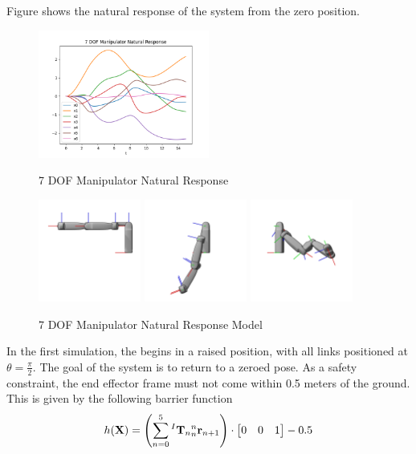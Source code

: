 \noindent Figure \label{fig:HighDOFNat} shows the natural response of the system from the zero position.

\begin{figure}[H]
    \centering
    \includegraphics[width=0.5\textwidth]{Figures/Examples/7DOF/NaturalResponse.png}
    \caption{7 DOF Manipulator Natural Response}
    \label{fig:HighDOFNat}
    \includegraphics[width=0.3\textwidth]{Figures/Examples/7DOF/Frame0WithFrames.png}
    \includegraphics[width=0.3\textwidth]{Figures/Examples/7DOF/Frame50WithFrames.png}
    \includegraphics[width=0.3\textwidth]{Figures/Examples/7DOF/Frame100WithFrames.png}
    \caption{7 DOF Manipulator Natural Response Model}
\end{figure}

In the first simulation, the begins in a raised position, with all links positioned at $\theta = \frac{\pi}{2}$. The goal of the system is to return to a zeroed pose. As a safety constraint, the end effector frame must not come within 0.5 meters of the ground. This is given by the following barrier function
\begin{align}
    h(\mathbf{X}) = \left (\sum_{n=0}^5 {^I\mathbf{T}_n}{^n_n\mathbf{r}_{n+1}} \right) \cdot \begin{bmatrix} 0 & 0 & 1\end{bmatrix} - 0.5
\end{align}

